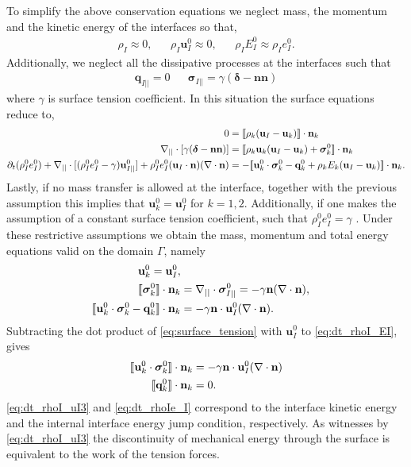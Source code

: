 To simplify the above conservation equations we neglect mass, the momentum and the kinetic energy of the interfaces so that,
\begin{align*}
    \rho_I \approx 0,
    &&
    \rho_I \textbf{u}_I^0 \approx 0,
    &&
    \rho_I E_I^0 \approx \rho_I e_I^0. 
\end{align*}
Additionally, we neglect all the dissipative processes at the interfaces such that
\begin{align*}
    \textbf{q}_{I||} = 0 
    &&
    \bm\sigma_{I||} = \gamma (\bm\delta  - \textbf{nn})
\end{align*}
where $\gamma$ is surface tension coefficient. 
In this situation the surface equations reduce to, 
\begin{align*}
    0&= 
    \llbracket 
        \rho_k (\textbf{u}_I - \textbf{u}_k)
     \rrbracket \cdot \textbf{n}_k
    \\
    \mathbf{\nabla}_{||}\cdot [\gamma ( \bm\delta - \textbf{nn})]
    &= 
    \llbracket 
        \rho_k \textbf{u}_k (\textbf{u}_I - \textbf{u}_k)
        + \bm\sigma^0_k
     \rrbracket \cdot \textbf{n}_k
    \\
    \partial_t (\rho_I^0e_I^0)  
    + \mathbf{\nabla}_{||}\cdot [
        (\rho_I^0 e_I^0 - \gamma)
         \textbf{u}_{I||}^0
        ]
    + \rho_I^0e_I^0  (\textbf{u}_I \cdot \textbf{n})(\mathbf{\nabla}\cdot \textbf{n})
    &= 
    -\llbracket \textbf{u}_k^0 \cdot \bm{\sigma}_k^0 - \textbf{q}_k^0
    + \rho_k E_k (\textbf{u}_I - \textbf{u}_k)
     \rrbracket \cdot \textbf{n}_k. 
\end{align*} 
Lastly, if no mass transfer is allowed at the interface, together with the previous assumption this implies that $\textbf{u}_k^0 = \textbf{u}_I^0$ for $k = 1,2$. 
Additionally, if one makes the assumption of a constant surface tension coefficient, such that $\rho_I^0 e_I^0 = \gamma$ \citep{ishii2010thermo}.  
Under these restrictive assumptions we obtain the mass, momentum and total energy equations valid on the domain $\Gamma$, namely
\begin{align}
    \label{eq:dt_rho_I}
    \textbf{u}_k^0 = \textbf{u}_I^0, \\
    \llbracket \bm{\sigma}_k^0 \rrbracket \cdot \textbf{n}_k 
    &=
    \mathbf{\nabla}_{||}\cdot\bm\sigma^0_{I||}
    =
    -\gamma\textbf{n}(\mathbf{\nabla}\cdot \textbf{n}),
    \label{eq:surface_tension}\\
    \label{eq:dt_rhoI_EI}
    \llbracket \textbf{u}_k^0 \cdot \bm{\sigma}_k^0 - \textbf{q}_k^0 \rrbracket \cdot \textbf{n}_k
    &=
    -\gamma\textbf{n}\cdot \textbf{u}_{I}^0(\mathbf{\nabla}\cdot \textbf{n}).
\end{align}
Subtracting the dot product of \ref{eq:surface_tension} with $\textbf{u}_I^0$ to \ref{eq:dt_rhoI_EI}, gives 
\begin{align}
    \label{eq:dt_rhoI_uI3}
    \llbracket \textbf{u}_k^0 \cdot \bm{\sigma}_k^0 \rrbracket \cdot \textbf{n}_k
    &=
    -\gamma\textbf{n}\cdot \textbf{u}_{I}^0(\mathbf{\nabla}\cdot \textbf{n})\\
    \label{eq:dt_rhoIe_I}
    \llbracket  \textbf{q}_k^0 \rrbracket \cdot \textbf{n}_k
    &= 
     0.
\end{align}
\ref{eq:dt_rhoI_uI3} and \ref{eq:dt_rhoIe_I} correspond to the interface kinetic energy and the internal interface energy jump condition, respectively. 
As witnesses by \ref{eq:dt_rhoI_uI3} the discontinuity of mechanical energy through the surface is equivalent to the work of the tension forces. 